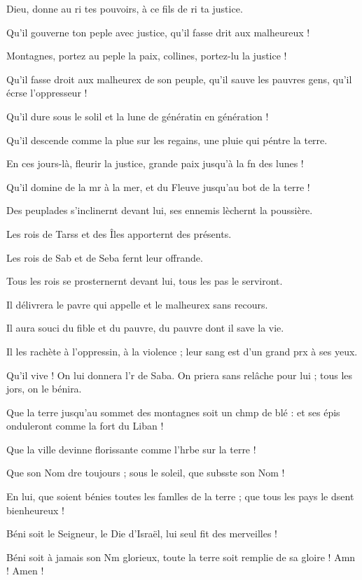 \item Dieu, donne au ri tes pouvoirs, à ce fils de ri ta justice.
\item Qu’il gouverne ton peple avec justice, qu’il fasse drit aux malheureux !
\item Montagnes, portez au peple la paix, collines, portez-lu la justice !
\item Qu’il fasse droit aux malheurex de son peuple, qu’il sauve les pauvres gens, qu’il écrse l’oppresseur !
\item Qu’il dure sous le solil et la lune de génératin en génération !
\item Qu’il descende comme la plue sur les regains, une pluie qui péntre la terre.
\item En ces jours-là, fleurir la justice, grande paix jusqu’à la fn des lunes !
\item Qu’il domine de la mr à la mer, et du Fleuve jusqu’au bot de la terre !
\item Des peuplades s’inclinernt devant lui, ses ennemis lèchernt la poussière.
\item Les rois de Tarss et des Îles apporternt des présents.
\item Les rois de Sab et de Seba fernt leur offrande.
\item Tous les rois se prosternernt devant lui, tous les pas le serviront.
\item Il délivrera le pavre qui appelle et le malheurex sans recours.
\item Il aura souci du fible et du pauvre, du pauvre dont il save la vie.
\item Il les rachète à l’oppressin, à la violence ; leur sang est d’un grand prx à ses yeux.
\item Qu’il vive ! On lui donnera l’r de Saba. On priera sans relâche pour lui ; tous les jors, on le bénira.
\item Que la terre jusqu’au sommet des montagnes soit un chmp de blé : et ses épis onduleront comme la fort du Liban ! 
\item Que la ville devinne florissante comme l’hrbe sur la terre !
\item Que son Nom dre toujours ; sous le soleil, que subsste son Nom !
\item En lui, que soient bénies toutes les famlles de la terre ; que tous les pays le dsent bienheureux !
\item Béni soit le Seigneur, le Die d’Israël, lui seul fit des merveilles !
\item Béni soit à jamais son Nm glorieux, toute la terre soit remplie de sa gloire ! Amn ! Amen !